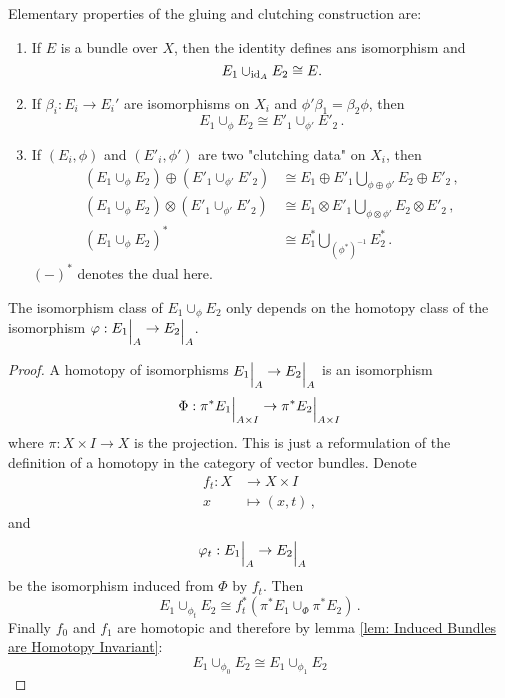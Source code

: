 \begin{cor}\label{cor: Elementary Properties of the Gluing and Clutching Construction}
	Elementary properties of the gluing and clutching construction are:
	\begin{enumerate}
		\item If $E$ is a bundle over $X$, then the identity defines ans isomorphism and 
		\begin{equation*}
			E_1 \cup_{\operatorname{\text{id}}_A}E_2 \cong E.
		\end{equation*}
		\item If $\beta_i:E_i \to E_i'$ are isomorphisms on $X_i$ and $\phi' \beta_1=\beta_2\phi$, then  
		\begin{equation*}
			E_1\cup_{\phi}E_2 \cong E'_1\cup_{\phi'}E'_2 \, .
		\end{equation*}
		\item If $(E_i,\phi)$ and $(E'_i,\phi')$ are two "clutching data" on $X_i$, then 
		\begin{align*}
			(E_1 \cup _{\phi}E_2)\oplus (E'_1 \cup _{\phi'}E'_2)&\cong E_1\oplus E'_1 \bigcup_{\phi \oplus \phi'}E_2\oplus E'_2 \, ,\\
			(E_1 \cup _{\phi}E_2)\otimes (E'_1 \cup_{\phi'}E'_2)&\cong E_1\otimes E'_1 \bigcup_{\phi \otimes \phi'}E_2\otimes E'_2 \, ,\\
			(E_1 \cup _{\phi}E_2)^* &\cong E^*_1\bigcup_{(\phi^*)^{-1}}E^*_2 \, .
		\end{align*} $(-)^*$ denotes the dual here.
	\end{enumerate}
\end{cor}
\begin{lemma}\label{lem: Clutching is unique up to homotopy}
	The isomorphism class of $E_1 \cup_{\phi}E_2$ only depends on the homotopy class of the isomorphism $\phi: {E_1}\einsch{A}\to {E_2}\einsch{A}$.
\end{lemma}
\begin{proof}
	A homotopy of isomorphisms ${E_1}\einsch{A}\to {E_2}\einsch{A}$ is an isomorphism 
	\begin{equation*}
		\Phi: \pi^*{E_1}\einsch{A \times I} \to \pi^* {E_2}\einsch{A\times I }
	\end{equation*} where $\pi:X\times I\to X$ is the projection. This is just a reformulation of the definition of a homotopy in the category of vector bundles. Denote 
	\begin{align*}
		f_t:X&\to X\times I\\
		x &\mapsto (x,t)\, ,
	\end{align*}  and 
	\begin{align*}
		\phi_t: {E_1}\einsch{A}&\to {E_2}\einsch{A} 
	\end{align*} be the isomorphism induced from $\Phi$ by $f_t$. Then
	\begin{equation*}
		E_1 \cup_{\phi_t} E_2 \cong f_t^*(\pi^*E_1 \cup_{\Phi}\pi^*E_2) \,.
	\end{equation*} Finally $f_0$ and $f_1$ are homotopic and therefore by lemma \ref{lem: Induced Bundles are Homotopy Invariant}:
	\begin{equation*}
		E_1 \cup_{\phi_0} E_2\cong E_1 \cup_{\phi_1} E_2
	\end{equation*}
\end{proof}
